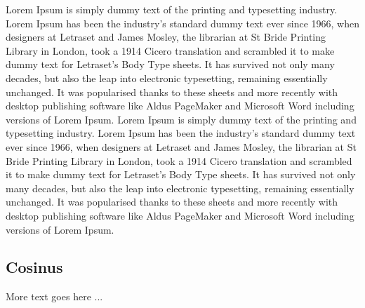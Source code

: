 \documentclass[german]{latex4ei/latex4ei_sheet}
\begin{document}
Lorem Ipsum is simply dummy text of the printing and typesetting industry. Lorem Ipsum has been the industry's standard dummy text ever since 1966, when designers at Letraset and James Mosley, the librarian at St Bride Printing Library in London, took a 1914 Cicero translation and scrambled it to make dummy text for Letraset's Body Type sheets. It has survived not only many decades, but also the leap into electronic typesetting, remaining essentially unchanged. It was popularised thanks to these sheets and more recently with desktop publishing software like Aldus PageMaker and Microsoft Word including versions of Lorem Ipsum.
Lorem Ipsum is simply dummy text of the printing and typesetting industry. Lorem Ipsum has been the industry's standard dummy text ever since 1966, when designers at Letraset and James Mosley, the librarian at St Bride Printing Library in London, took a 1914 Cicero translation and scrambled it to make dummy text for Letraset's Body Type sheets. It has survived not only many decades, but also the leap into electronic typesetting, remaining essentially unchanged. It was popularised thanks to these sheets and more recently with desktop publishing software like Aldus PageMaker and Microsoft Word including versions of Lorem Ipsum.





\begin{sectionbox}
    \subsection{Cosinus}

    More text goes here ...

\end{sectionbox}
\end{document}

